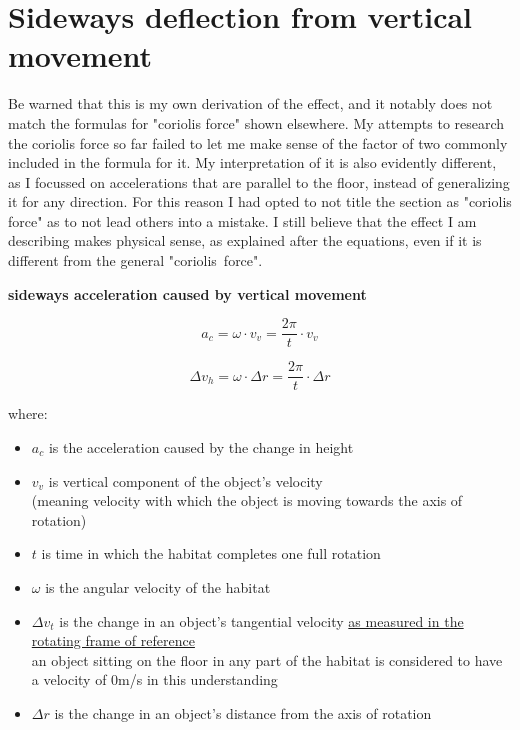 \documentclass[a4paper]{article}
\begin{document}
	\pagebreak
	
	\section{Sideways deflection from vertical movement}
	
	Be warned that this is my own derivation of the effect, and it notably does not match the formulas for "coriolis force" shown elsewhere. My attempts to research the coriolis force so far failed to let me make sense of the factor of two commonly included in the formula for it. My interpretation of it is also evidently different, as I focussed on accelerations that are parallel to the floor, instead of generalizing it for any direction. For this reason I had opted to not title the section as "coriolis force" as to not lead others into a mistake. I still believe that the effect I am describing makes physical sense, as explained after the equations, even if it is different from the general "coriolis~force".
	
	\medskip
	
	\begin{center}
		\textbf{sideways acceleration caused by vertical movement}
	\end{center}
	
	$$ a_c = \omega \cdot v_v = \frac{2 \pi}{t} \cdot v_v $$
	
	$$ \Delta v_h = \omega \cdot \Delta r = \frac{2 \pi}{t} \cdot \Delta r $$
	
	where:
	
	\begin{itemize}
		\item $a_c$ is the acceleration caused by the change in height
		
		\item $v_v$ is vertical component of the object's velocity\\(meaning velocity with which the object is moving towards the axis of rotation)
		
		\item $t$ is time in which the habitat completes one full rotation
		
		\item $\omega$ is the angular velocity of the habitat
		
		\item $\Delta v_t$ is the change in an object's tangential velocity \underline{as measured in the rotating frame of reference}\\an object sitting on the floor in any part of the habitat is considered to have a velocity of 0m/s in this understanding
		
		\item $\Delta r$ is the change in an object's distance from the axis of rotation
	\end{itemize}
	
\end{document}
